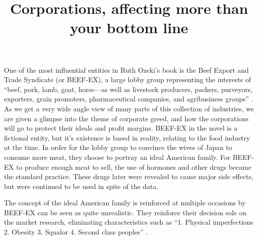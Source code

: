 \documentclass{article}
\title{Corporations, affecting more than your bottom line}
\begin{document}
\makeheader

One of the most influential entities in Ruth Ozeki's book
 is the Beef Export and Trade Syndicate (or BEEF-EX),
a large lobby group representing the interests of ``beef, pork, lamb, goat,
horse—as well as livestock producers, packers, purveyors, exporters, grain
promoters, pharmaceutical companies, and agribusiness groups''
\cite{ozeki1998my}. As we get a very wide angle view of many parts of this
collection of industries, we are given a glimpse into the theme of corporate
greed, and how the corporations will go to protect their ideals and profit
margins. BEEF-EX in the novel is a fictional entity, but it's existence is
based in reality, relating to the food industry at the time. In order for
the lobby group to convince the wives of Japan to consume more meat, they
choose to portray an ideal American family. For BEEF-EX to produce enough
meat to sell, the use of hormones and other drugs became the standard
practice. These drugs later were revealed to cause major side effects, but
were continued to be used in spite of the data.


The concept of the ideal American family is reinforced at multiple occasions
by BEEF-EX can be seen as quite unrealistic. They reinforce their decision
sole on the market research, eliminating characteristics such as ``1.
Physical imperfections 2. Obesity 3. Squalor 4. Second class peoples''
\cite{ozeki1998my}.


\end{document}
